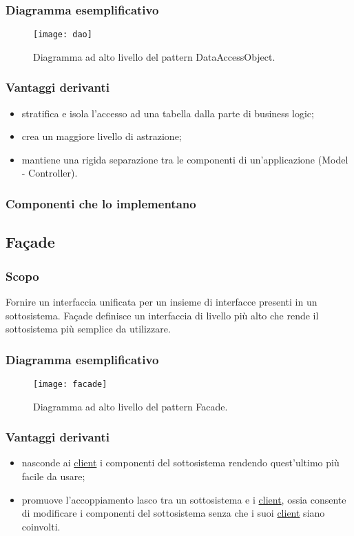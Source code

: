 \subsubsection{Diagramma esemplificativo}
\begin{figure}[h]
\centering
\texttt{[image: dao]}
\caption{Diagramma ad alto livello del pattern DataAccessObject.}\label{fig:dao}
\end{figure}
\subsubsection{Vantaggi derivanti}
\begin{itemize}
\item stratifica e isola l'accesso ad una tabella dalla parte di business logic;
\item crea un maggiore livello di astrazione;
\item mantiene una rigida separazione tra le componenti di un'applicazione (Model - Controller).
\end{itemize}
\subsubsection{Componenti che lo implementano}

\subsection{Façade}
\subsubsection{Scopo}
Fornire un interfaccia unificata per un insieme di interfacce presenti in un sottosistema. Façade definisce un interfaccia di livello più alto che rende il sottosistema più semplice da utilizzare.
\subsubsection{Diagramma esemplificativo}
\begin{figure}[h]
\centering
\texttt{[image: facade]}
\caption{Diagramma ad alto livello del pattern Facade.}\label{fig:facade}
\end{figure}
\subsubsection{Vantaggi derivanti}
\begin{itemize}
\item nasconde ai \underline{client} i componenti del sottosistema rendendo quest'ultimo più facile da usare;
\item promuove l'accoppiamento lasco tra un sottosistema e i \underline{client}, ossia consente di modificare i componenti del sottosistema senza che i suoi \underline{client} siano coinvolti.
\end{itemize}
